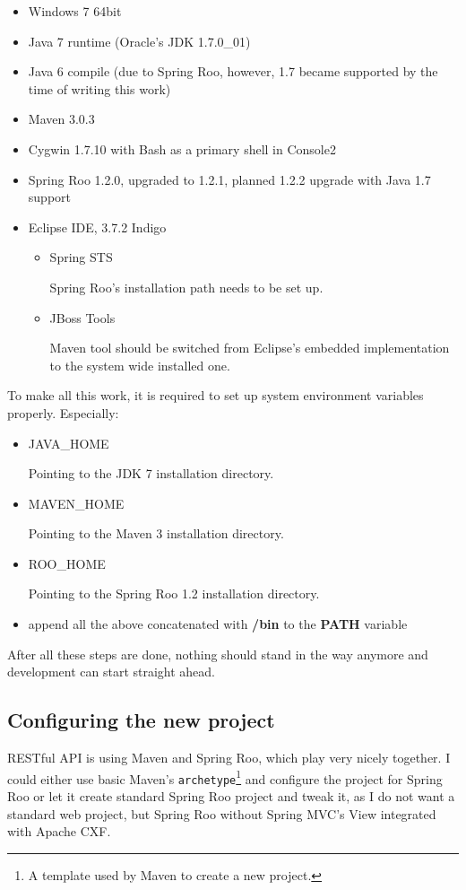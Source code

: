 	\begin{itemize}
		\item Windows 7 64bit
		\item Java 7 runtime (Oracle's JDK 1.7.0\_01)
		\item Java 6 compile (due to Spring Roo, however, 1.7 became supported by the time of writing this work)
		\item Maven 3.0.3
		\item Cygwin 1.7.10 with Bash as a primary shell in Console2
		\item Spring Roo 1.2.0, upgraded to 1.2.1, planned 1.2.2 upgrade with Java 1.7 support
		\item Eclipse IDE, 3.7.2 Indigo
		\begin{itemize}
			\item Spring STS
			
			Spring Roo's installation path needs to be set up.
			\item JBoss Tools  
			
			Maven tool should be switched from Eclipse's embedded implementation to the system wide installed one.
		\end{itemize}
	\end{itemize}
	
	To make all this work, it is required to set up system environment variables properly. Especially:
	
	\begin{itemize}
		\item JAVA\_HOME
		
		Pointing to the JDK 7 installation directory.
		\item MAVEN\_HOME
		
		Pointing to the Maven 3 installation directory.
		\item ROO\_HOME
		
		Pointing to the Spring Roo 1.2 installation directory.
		\item append all the above concatenated with \textbf{/bin} to the \textbf{PATH} variable 
	\end{itemize}
	
	After all these steps are done, nothing should stand in the way anymore and development can start straight ahead.
	
	\subsection{Configuring the new project}
	
	RESTful API is using Maven and Spring Roo, which play very nicely together. I could either use basic Maven's
	\verb|archetype|\footnote{A template used by Maven to create a new project.} and configure the project for Spring Roo
	or let it create standard Spring Roo project and tweak it, as I do not want a standard web project, but Spring Roo
	without Spring MVC's View integrated with Apache CXF.
	
